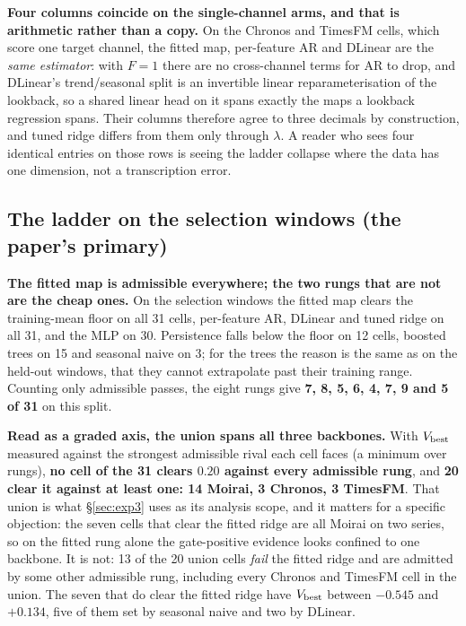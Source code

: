 \textbf{Four columns coincide on the single-channel arms, and that is arithmetic
rather than a copy.}  On the Chronos and TimesFM cells, which score one target
channel, the fitted map, per-feature AR and DLinear are the \emph{same estimator}:
with $F{=}1$ there are no cross-channel terms for AR to drop, and DLinear's
trend/seasonal split is an invertible linear reparameterisation of the lookback, so
a shared linear head on it spans exactly the maps a lookback regression spans.
Their columns therefore agree to three decimals by construction, and tuned ridge
differs from them only through $\lambda$.  A reader who sees four identical entries
on those rows is seeing the ladder collapse where the data has one dimension, not
a transcription error.

\subsection{The ladder on the selection windows (the paper's primary)}
\label{app:baselines:val}

\begin{table}[ht]
\centering
\caption{\textbf{Gate $\Vb{b}$ under eight denominators and a floor, on the
\emph{selection} windows.}  Same conventions as
Table~\ref{tab:baselinefamily}; this is the split every admission decision in the
body is made on, and the numerator comes from
\texttt{results/gate\_val\_side.json}.  Generated by
\texttt{scripts/gate\_baseline\_sensitivity.py --split val}.}
\label{tab:baselinefamilyval}

\end{table}

\textbf{The fitted map is admissible everywhere; the two rungs that are not are
the cheap ones.}  On the selection windows the fitted map clears the training-mean
floor on all 31 cells, per-feature AR, DLinear and tuned ridge on all 31, and the
MLP on 30.  Persistence falls below the floor on 12 cells, boosted trees on 15 and
seasonal naive on 3; for the trees the reason is the same as on the held-out
windows, that they cannot extrapolate past their training range.  Counting only
admissible passes, the eight rungs give
\textbf{7, 8, 5, 6, 4, 7, 9 and 5 of 31} on this split.

\textbf{Read as a graded axis, the union spans all three backbones.}  With
$V_{\text{best}}$ measured against the strongest admissible rival each cell
faces (a minimum over rungs), \textbf{no cell of the 31 clears $0.20$ against
every admissible rung}, and \textbf{20 clear it against at least one: 14 Moirai, 3
Chronos, 3 TimesFM}.  That union is what \S\ref{sec:exp3} uses as its analysis
scope, and it matters for a specific objection: the seven cells that clear the
fitted ridge are all Moirai on two series, so on the fitted rung alone the
gate-positive evidence looks confined to one backbone.  It is not: 13 of the 20
union cells \emph{fail} the fitted ridge and are admitted by some other admissible
rung, including every Chronos and TimesFM cell in the union.  The seven that do
clear the fitted ridge have $V_{\text{best}}$ between $-0.545$ and
$+0.134$, five of them set by seasonal naive and two by DLinear.

